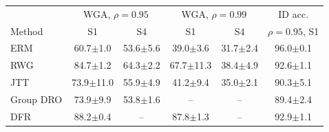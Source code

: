 \begin{tabular}{l cc cc c}
\toprule
 & \multicolumn{2}{c}{WGA, $\rho=0.95$} & \multicolumn{2}{c}{WGA, $\rho=0.99$} & ID acc. \\
Method & S1 & S4 & S1 & S4 & $\rho=0.95$, S1 \\
\midrule
ERM & 60.7$\pm$1.0 & 53.6$\pm$5.6 & 39.0$\pm$3.6 & 31.7$\pm$2.4 & 96.0$\pm$0.1 \\
RWG & 84.7$\pm$1.2 & 64.3$\pm$2.2 & 67.7$\pm$11.3 & 38.4$\pm$4.9 & 92.6$\pm$1.1 \\
JTT & 73.9$\pm$11.0 & 55.9$\pm$4.9 & 41.2$\pm$9.4 & 35.0$\pm$2.1 & 90.3$\pm$5.1 \\
Group DRO & 73.9$\pm$9.9 & 53.8$\pm$1.6 & -- & -- & 89.4$\pm$2.4 \\
DFR & 88.2$\pm$0.4 & -- & 87.8$\pm$1.3 & -- & 92.9$\pm$1.1 \\
\bottomrule
\end{tabular}
